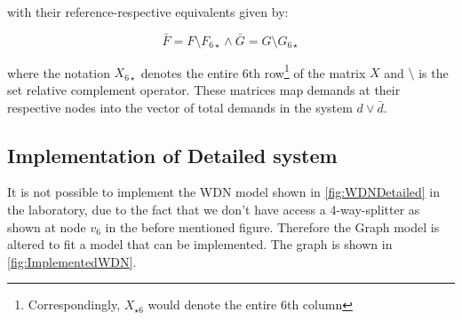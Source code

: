 with their reference-respective equivalents given by:

\begin{equation}\label{eq:FbarGbar}
	\bar{F} = F \setminus F_{6\star} \wedge \bar{G} = G \setminus G_{6\star}
\end{equation}

where the notation $X_{6\star}$ denotes the entire 6th row\footnote{Correspondingly, $X_{\star6}$ would denote the entire 6th column} of the matrix $X$ and $\setminus$ is the set relative complement operator. These matrices map demands at their respective nodes into the vector of total demands in the system $d \vee \bar{d}$.

\newpage
\subsection{Implementation of Detailed system}
It is not possible to implement the WDN model shown in \cref{fig:WDNDetailed} in the laboratory, due to the fact that we don't have access a 4-way-splitter as shown at node $v_6$ in the before mentioned figure. Therefore the Graph model is altered to fit a model that can be implemented. The graph is shown in \cref{fig:ImplementedWDN}.
  
